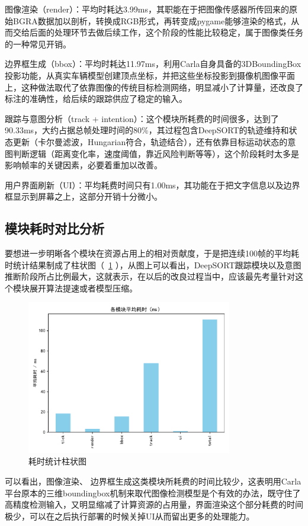 图像渲染（render）：平均时耗达3.99ms，其职能在于把图像传感器所传回来的原始BGRA数据加以剖析，转换成RGB形式，再转变成pygame能够渲染的格式，从而交给后面的处理环节去做后续工作，这个阶段的性能比较稳定，属于图像类任务的一种常见开销。

边界框生成（bbox）：平均时耗达11.97ms，利用Carla自身具备的3DBoundingBox投影功能，从真实车辆模型创建顶点坐标，并把这些坐标投影到摄像机图像平面上，这种做法取代了依靠图像的传统目标检测网络，明显减小了计算量，还改良了标注的准确性，给后续的跟踪供应了稳定的输入。

跟踪与意图分析（track + intention）：这个模块所耗费的时间很多，达到了90.33ms，大约占据总帧处理时间的80\%，其过程包含DeepSORT的轨迹维持和状态更新（卡尔曼滤波，Hungarian符合，轨迹结合），还有依靠目标运动状态的意图判断逻辑（距离变化率，速度阈值，靠近风险判断等等），这个阶段耗时太多是影响帧率的关键因素，必要着重加以改善。

用户界面刷新（UI）：平均耗费时间只有1.00ms，其功能在于把文字信息以及边界框显示到屏幕之上，这部分开销十分微小。

\subsection{模块耗时对比分析}

要想进一步明晰各个模块在资源占用上的相对贡献度，于是把连续100帧的平均耗时统计结果制成了柱状图（~\ref{fig:time} ），从图上可以看出，DeepSORT跟踪模块以及意图推断阶段所占比例最大，这就表示，在以后的改良过程当中，应该最先考量针对这个模块展开算法提速或者模型压缩。

\begin{figure}[H]
    \centering
    \includegraphics[width=0.8\textwidth]{images/图12 耗时统计柱状图.pdf}  %
    \caption{耗时统计柱状图}
    \label{fig:time}  %
\end{figure}

可以看出，图像渲染、 边界框生成这类模块所耗费的时间比较少，这表明用Carla平台原本的三维boundingbox机制来取代图像检测模型是个有效的办法，既守住了高精度检测输入，又明显缩减了计算资源的占用量，界面渲染这个部分耗费的时间极少，可以在之后执行部署的时候关掉UI从而留出更多的处理能力。


\begin{tabular}{l l}
\end{tabular}
